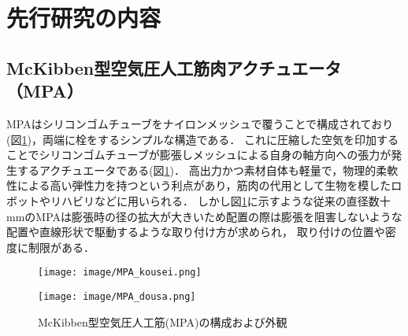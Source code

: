 \newpage
\section{先行研究の内容}
\subsection{McKibben型空気圧人工筋肉アクチュエータ（MPA）}
MPAはシリコンゴムチューブをナイロンメッシュで覆うことで構成されており(図\ref{fig:MPA})，両端に栓をするシンプルな構造である．
これに圧縮した空気を印加することでシリコンゴムチューブが膨張しメッシュによる自身の軸方向への張力が発生するアクチュエータである(図\ref{fig:MPA})．
高出力かつ素材自体も軽量で，物理的柔軟性による高い弾性力を持つという利点があり，筋肉の代用として生物を模したロボットやリハビリなどに用いられる．
しかし図\ref{fig:MPA}に示すような従来の直径数十 mmのMPAは膨張時の径の拡大が大きいため配置の際は膨張を阻害しないような配置や直線形状で駆動するような取り付け方が求められ，
取り付けの位置や密度に制限がある．
\begin{figure}[b]
  \begin{minipage}{0.49\columnwidth}
    \vspace{4mm}
    \centering
    \texttt{[image: image/MPA\_kousei.png]}
    \vspace{3mm}
    \label{fig:Structure}
  \end{minipage}
  \begin{minipage}{0.49\columnwidth}
    \vspace{25mm}
    \centering
    \texttt{[image: image/MPA\_dousa.png]}
    \label{fig:move}
  \end{minipage}
  \caption{McKibben型空気圧人工筋(MPA)の構成および外観\cite{中西大輔2020}}
  \label{fig:MPA}
\end{figure}
